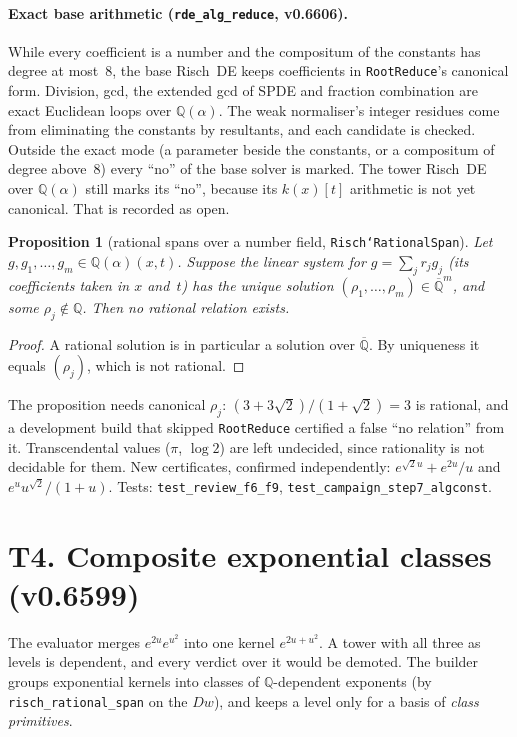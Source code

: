 \documentclass[11pt]{article}
\newtheorem{proposition}[theorem]{Proposition}
\theoremstyle{definition}
\theoremstyle{remark}
\newcommand{\Q}{\mathbb{Q}}
\newcommand{\Qbar}{\overline{\mathbb{Q}}}
\newcommand{\code}[1]{\texttt{#1}}
\begin{document}
\paragraph{Exact base arithmetic (\code{rde\_alg\_reduce}, v0.6606).} While every
coefficient is a number and the compositum of the constants has degree at most~8, the
base Risch~DE keeps coefficients in \code{RootReduce}'s canonical form. Division, gcd,
the extended gcd of SPDE and fraction combination are exact Euclidean loops over
$\Q(\alpha)$. The weak normaliser's integer residues come from eliminating the
constants by resultants, and each candidate is checked. Outside the exact mode (a
parameter beside the constants, or a compositum of degree above~8) every ``no'' of the
base solver is marked. The tower Risch~DE over $\Q(\alpha)$ still marks its ``no'',
because its $k(x)[t]$ arithmetic is not yet canonical. That is recorded as open.

\begin{proposition}[rational spans over a number field, \code{Risch`RationalSpan}]\label{prop:T3}
Let $g,g_1,\dots,g_m\in\Q(\alpha)(x,t)$. Suppose the linear system for
$g=\sum_jr_jg_j$ (its coefficients taken in $x$ and~$t$) has the unique solution
$(\rho_1,\dots,\rho_m)\in\Qbar^m$, and some $\rho_j\notin\Q$. Then no rational relation
exists.
\end{proposition}

\begin{proof}
A rational solution is in particular a solution over $\Qbar$. By uniqueness it equals
$(\rho_j)$, which is not rational.
\end{proof}

The proposition needs canonical $\rho_j$: $(3+3\sqrt2)/(1+\sqrt2)=3$ is rational, and a
development build that skipped \code{RootReduce} certified a false ``no relation''
from it. Transcendental values ($\pi$, $\log2$) are left undecided, since rationality
is not decidable for them. New certificates, confirmed independently:
$e^{\sqrt2u}+e^{2u}/u$ and $e^uu^{\sqrt2}/(1+u)$. Tests: \code{test\_review\_f6\_f9},
\code{test\_campaign\_step7\_algconst}.

\section*{T4. Composite exponential classes (v0.6599)}

The evaluator merges $e^{2u}e^{u^2}$ into one kernel $e^{2u+u^2}$. A tower with all
three as levels is dependent, and every verdict over it would be demoted. The builder
groups exponential kernels into classes of $\Q$-dependent exponents (by
\code{risch\_rational\_span} on the $Dw$), and keeps a level only for a basis of
\emph{class primitives}.
\end{document}

